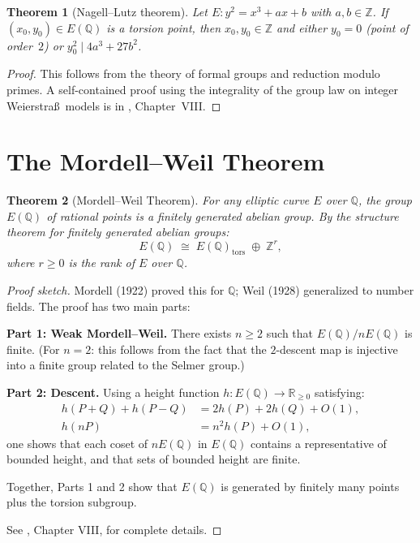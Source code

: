 \documentclass[12pt,a4paper]{amsart}
\newtheorem{theorem}{Theorem}[section]
\theoremstyle{definition}
\newcommand{\Z}{\mathbb{Z}}
\newcommand{\Q}{\mathbb{Q}}
\newcommand{\R}{\mathbb{R}}
\begin{document}
\begin{theorem}[Nagell--Lutz theorem]
\label{thm:nagell_lutz}
Let $E: y^2 = x^3 + ax + b$ with $a, b \in \Z$.
If $(x_0, y_0) \in E(\Q)$ is a torsion point, then $x_0, y_0 \in \Z$
and either $y_0 = 0$ (point of order~$2$) or $y_0^2 \mid 4a^3 + 27b^2$.
\end{theorem}

\begin{proof}
This follows from the theory of formal groups and reduction modulo primes.
A self-contained proof using the integrality of the group law on
integer Weierstra\ss\ models is in \cite{Silverman1986}, Chapter~VIII.
\end{proof}

\section{The Mordell--Weil Theorem}

\begin{theorem}[Mordell--Weil Theorem]
\label{thm:mordell_weil}
For any elliptic curve $E$ over $\Q$, the group $E(\Q)$ of rational
points is a finitely generated abelian group.  By the structure theorem
for finitely generated abelian groups:
\begin{equation}
  \label{eq:mw}
  E(\Q) \;\cong\; E(\Q)_{\mathrm{tors}} \;\oplus\; \Z^r,
\end{equation}
where $r \ge 0$ is the \emph{rank} of $E$ over $\Q$.
\end{theorem}

\begin{proof}[Proof sketch]
Mordell (1922) proved this for $\Q$; Weil (1928) generalized to
number fields.
The proof has two main parts:

\textbf{Part 1: Weak Mordell--Weil.}
There exists $n \ge 2$ such that $E(\Q)/nE(\Q)$ is finite.
(For $n = 2$: this follows from the fact that the $2$-descent map
is injective into a finite group related to the Selmer group.)

\textbf{Part 2: Descent.}
Using a height function $h: E(\Q) \to \R_{\ge 0}$ satisfying:
\begin{align}
  h(P+Q) + h(P-Q) &= 2h(P) + 2h(Q) + O(1), \label{eq:parallelogram} \\
  h(nP) &= n^2 h(P) + O(1), \label{eq:quadratic}
\end{align}
one shows that each coset of $nE(\Q)$ in $E(\Q)$ contains a representative
of bounded height, and that sets of bounded height are finite.

Together, Parts 1 and 2 show that $E(\Q)$ is generated by finitely many
points plus the torsion subgroup.

See \cite{Silverman1986}, Chapter VIII, for complete details.
\end{proof}
\end{document}
